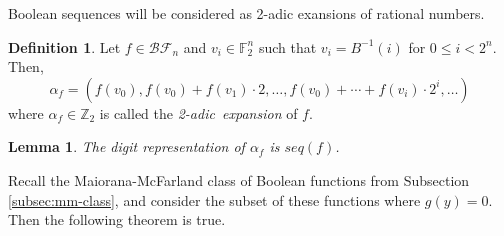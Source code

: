 \documentclass[english]{article}
\def\zzz{\mathbb{Z}}
\def\gftwo{\mathbb{F}_2}
\def\BF{\mathcal{BF}}
\theoremstyle{plain}
\newtheorem{lemma}[theorem]{Lemma}%
\theoremstyle{definition}
\newtheorem{definition}[theorem]{Definition}%
\theoremstyle{remark}
\begin{document}
\par Boolean sequences will be considered as 2-adic exansions of rational
numbers.

\begin{definition}\label{2-adic-ex}
  Let $f\in\BF_n$ and $v_i\in\gftwo^n$ such that $v_i=B^{-1}(i)$ for
  $0\leq i<2^n$. Then,
  \begin{equation}
    \alpha_f=(f(v_0),f(v_0)+f(v_1)\cdot2,\dots,\allowbreak
      f(v_0)+\cdots\allowbreak+f(v_i)\cdot2^i,\allowbreak\dots)
  \end{equation}
  where $\alpha_f\in\zzz_2$ is called the {\em 2-adic\ expansion} of $f$.
\end{definition}

\begin{lemma}
  The digit representation of $\alpha_f$ is $seq(f)$.
\end{lemma}

\par Recall the Maiorana-McFarland class of Boolean functions from Subsection \ref{subsec:mm-class}, and consider
the subset of these functions where $g(y)=0$. Then the following theorem is
true.
\end{document}
